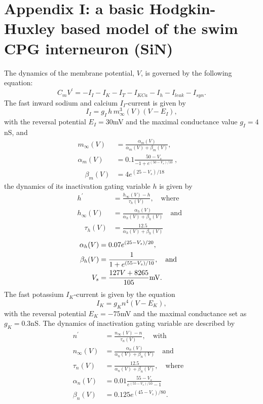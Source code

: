 \documentclass[nofootinbib,aip,amsmath,amssymb,reprint,twocolumn,10pt]{revtex4-2}
\begin{document}
\section*{Appendix I: a basic Hodgkin-Huxley based model of the swim CPG interneuron (SiN)} \label{sec:appendix1}
The dynamics of the membrane potential, $V$, is governed by the following equation:
\begin{equation}
 	C_{m} {V}^\prime = -I_{I} - I_K - I_{T}  - I_{KCa} -  I_{h}  - I_{leak}  - I_{syn}.  \label{a1}
 \end{equation}
 The fast inward sodium and calcium $I_{I}$-current is given by   
\begin{equation}
I_{I}=g_{I}\,h\, m^{3}_{\infty}(V)(V-E_{I}), 
 \end{equation}
with the reversal potential $E_{I}=30$mV and the maximal conductance value $g_{I}=4$nS, and  
\begin{align}
 m_{\infty}(V) &= \frac{\alpha_{m}(V)}{\alpha_{m}(V) +\beta_{m}(V)}, \qquad  \\
 \alpha_{m}(V) &= 0.1 \frac{50-V_s}{-1+e^{(50-V_s)/10}}\ , \\ 
 \quad \beta_{m}(V) &= 4 e^{(25-V_s)/18}  
\end{align}
 the dynamics of its inactivation  gating variable $h$ is given by      
\begin{align}
 {h}^\prime &=  \frac{h_{\infty}(V)-h}{ {\tau_{h}(V)} }, \quad \mbox{where} \quad \\
h_{\infty}(V) &= \frac{\alpha_{h}(V)}{\alpha_{h}(V) +\beta_{h}(V)}\quad \mbox{and} \\
 \quad \tau_{h}(V) &= \frac{12.5}{\alpha_{h}(V) +\beta_{h}(V)} 
\end{align}
 \begin{align}
 \alpha_{h}(V) &= 0.07 e^{(25-V_s)/20}, \\
 \beta_{h}(V) &= \frac{1}{1+e^{(55-V_s)/10}}, \quad \mbox{and} \quad \\
 V_s &= \frac{127V+8265}{105}{\rm mV}.
 \end{align} 
  The fast potassium $I_K$-current is given by the equation  
\begin{equation}
I_K=g_{K} n^{4}(V-E_{K}),  
\end{equation}
with the reversal potential $E_{K}=-75$mV and the maximal conductance set as $g_K=0.3$nS. The dynamics of inactivation gating variable are described by 
\begin{align}
{n}^\prime &= \frac{n_{\infty}(V)-n}{\tau_{n}(V)}, \quad \mbox{with} \quad \\
n_{\infty}(V) &= \frac{\alpha_{n}(V)}{\alpha_{n}(V) +\beta_{n}(V)} \quad \mbox{and} \quad \\
\tau_{n}(V) &= \frac{12.5}{\alpha_{n}(V) +\beta_{n}(V)}, \quad \mbox{where} \quad \\
\alpha_{n}(V) &= 0.01 \frac{55-V_s}{e^{(55-V_s)/10}-1} \quad \mbox{} \quad \\
\beta_{n}(V) &= 0.125 e^{(45-V_s)/80}.
\end{align}	
\end{document}
